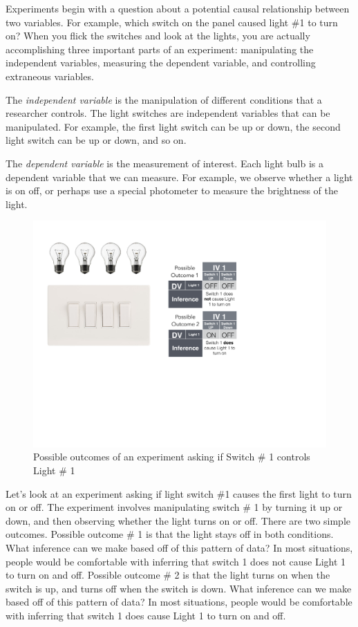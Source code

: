 Experiments begin with a question about a potential causal relationship between two variables. For example, which switch on the panel caused light \#1 to turn on? When you flick the switches and look at the lights, you are actually accomplishing three important parts of an experiment: manipulating the independent variables, measuring the dependent variable, and controlling extraneous variables.

The \emph{independent variable} is the manipulation of different conditions that a researcher controls. The light switches are independent variables that can be manipulated. For example, the first light switch can be up or down, the second light switch can be up or down, and so on.

The \emph{dependent variable} is the measurement of interest. Each light bulb is a dependent variable that we can measure. For example, we observe whether a light is on off, or perhaps use a special photometer to measure the brightness of the light.

\begin{figure}[0in]
\includegraphics[width=\linewidth]{figures/Light2.pdf}
\caption{Possible outcomes of an experiment asking if Switch \# 1 controls Light \# 1}
\label{fig:confound}
\end{figure}

Let's look at an experiment asking if light switch \#1 causes the first light to turn on or off. The experiment involves manipulating switch \# 1 by turning it up or down, and then observing whether the light turns on or off. There are two simple outcomes. Possible outcome \# 1 is that the light stays off in both conditions. What inference can we make based off of this pattern of data? In most situations, people would be comfortable with inferring that switch 1 does not cause Light 1 to turn on and off. Possible outcome \# 2 is that the light turns on when the switch is up, and turns off when the switch is down. What inference can we make based off of this pattern of data? In most situations, people would be comfortable with inferring that switch 1 does  cause Light 1 to turn on and off.

